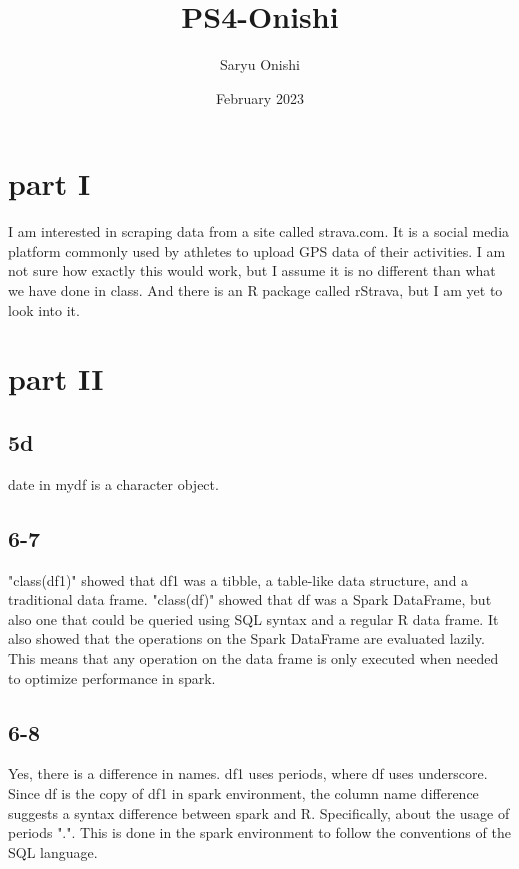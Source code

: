 \documentclass{article}
\title{PS4-Onishi}
\author{Saryu Onishi}
\date{February 2023}
\begin{document}
\maketitle
\section{part I}
I am interested in scraping data from a site called strava.com. It is a social media platform commonly used by athletes to upload GPS data of their activities. I am not sure how exactly this would work, but I assume it is no different than what we have done in class. And there is an R package called rStrava, but I am yet to look into it.

\section{part II}

\subsection{5d}
date in mydf is a character object.

\subsection{6-7}
"class(df1)" showed that df1 was a tibble, a table-like data structure, and a traditional data frame.
"class(df)" showed that df was a Spark DataFrame, but also one that could be queried using SQL syntax and a regular R data frame. It also showed that the operations on the Spark DataFrame are evaluated lazily. This means that any operation on the data frame is only executed when needed to optimize performance in spark.

\subsection{6-8}
Yes, there is a difference in names. df1 uses periods, where df uses underscore. Since df is the copy of df1 in spark environment, the column name difference suggests a syntax difference between spark and R. Specifically, about the usage of periods ".". This is done in the spark environment to follow the conventions of the SQL language. 
\end{document}
